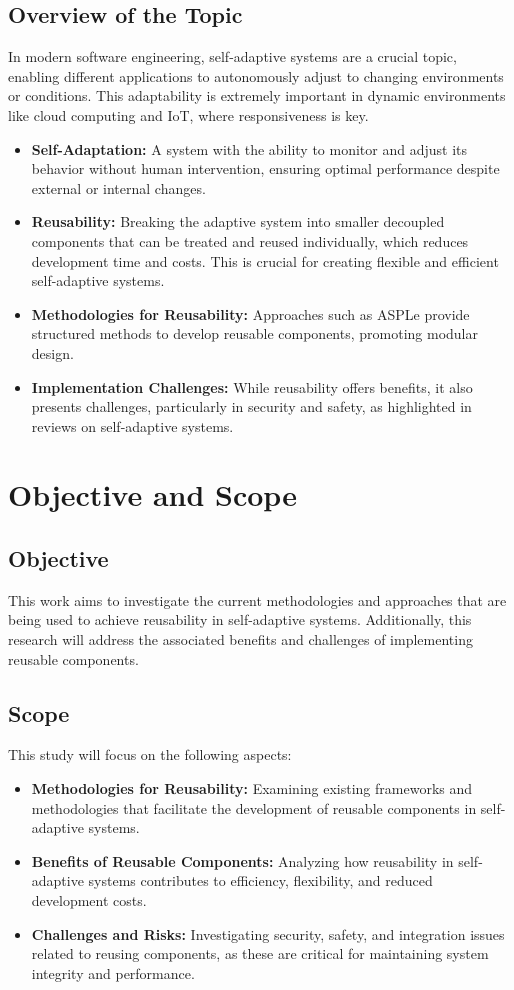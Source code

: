 \documentclass[a4paper, 12pt]{article}
\begin{document}
\subsection*{Overview of the Topic}
In modern software engineering, self-adaptive systems are a crucial topic, enabling different applications to autonomously adjust to changing environments or conditions. This adaptability is extremely important in dynamic environments like cloud computing and IoT, where responsiveness is key.

\begin{itemize}
    \item \textbf{Self-Adaptation:} A system with the ability to monitor and adjust its behavior without human intervention, ensuring optimal performance despite external or internal changes.
    \item \textbf{Reusability:} Breaking the adaptive system into smaller decoupled components that can be treated and reused individually, which reduces development time and costs. This is crucial for creating flexible and efficient self-adaptive systems.
    \item \textbf{Methodologies for Reusability:} Approaches such as ASPLe provide structured methods to develop reusable components, promoting modular design.
    \item \textbf{Implementation Challenges:} While reusability offers benefits, it also presents challenges, particularly in security and safety, as highlighted in reviews on self-adaptive systems.
\end{itemize}

\section{Objective and Scope}
\subsection*{Objective}
This work aims to investigate the current methodologies and approaches that are being used to achieve reusability in self-adaptive systems. Additionally, this research will address the associated benefits and challenges of implementing reusable components.

\subsection*{Scope}
This study will focus on the following aspects:
\begin{itemize}
    \item \textbf{Methodologies for Reusability:} Examining existing frameworks and methodologies that facilitate the development of reusable components in self-adaptive systems.
    \item \textbf{Benefits of Reusable Components:} Analyzing how reusability in self-adaptive systems contributes to efficiency, flexibility, and reduced development costs.
    \item \textbf{Challenges and Risks:} Investigating security, safety, and integration issues related to reusing components, as these are critical for maintaining system integrity and performance.
\end{itemize}
\end{document}
